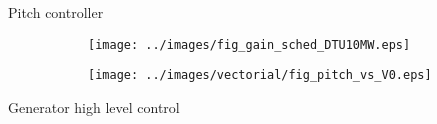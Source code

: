 \begin{frame}{Pitch controller}
  \begin{figure}
    \centering
      \centering
      \begingroup
        
      \endgroup
  \end{figure} 
  \begin{figure}
    \begin{subfigure}{0.49\textwidth}
      \centering
      \texttt{[image: ../images/fig\_gain\_sched\_DTU10MW.eps]}
    \end{subfigure}
    \begin{subfigure}{0.49\textwidth}
      \centering
      \texttt{[image: ../images/vectorial/fig\_pitch\_vs\_V0.eps]}
    \end{subfigure}
  \end{figure}
\end{frame}

\begin{frame}{Generator high level control}

  \begin{figure}
    \begin{subfigure}{\columnwidth}
      \centering
      \begingroup
        
      \endgroup
    \end{subfigure}
    \\
    \begin{subfigure}{\columnwidth}
      \centering
      \begingroup
        
      \endgroup
    \end{subfigure}
  \end{figure}

\end{frame}

